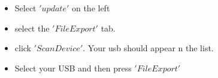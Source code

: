 \documentclass{article}
\begin{document}
\begin{itemize}
\begin{center}
\end{center}
\item Select $'update'$ on the left
\begin{center}
\end{center}
\item select the $'File Export'$ tab. 
\begin{center}
\end{center}
\item click $'Scan Device'$. Your usb should appear n the list. 
\item Select your USB and then press $'File Export'$
\end{itemize}
\end{document}
